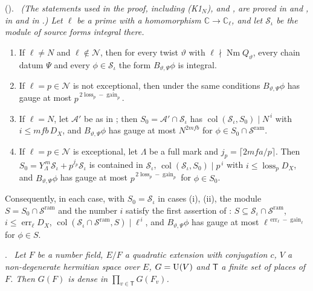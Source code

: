 \documentclass[10pt]{amsart}
\theoremstyle{definition}
\theoremstyle{remark}
\newcommand{\C}{\mathbb C}
\providecommand{\auDX}{D_X}
\providecommand{\auNm}{\operatorname{Nm}}
\providecommand{\auS}{\mathcal S}
\providecommand{\auSram}{\mathcal S^{\mathrm{ram}}}
\providecommand{\aucol}{\operatorname{col}}
\providecommand{\auerr}{\operatorname{err}}
\providecommand{\augain}{\operatorname{gain}}
\providecommand{\paloss}{\operatorname{loss}}
\newenvironment{quotedthm}[2]{\par\medskip\noindent\begingroup
  \textbf{#1}#2.\ \itshape\ignorespaces}{\endgroup\par\medskip}
\begin{document}
\begin{quotedthm}{\cite[Theorem~4.21]{P49}}{ ({\cite[Proposition~14.20]{P46}})}
(The statements used in the proof, {\cite[Lemma~4.13]{P49}} including (K1$_N$),
{\cite[Lemma~5.6(c)]{P49}} and {\cite[Proposition~14.25]{P46}}, are proved in {\cite[\S5.2.9]{P49}}
and {\cite[Corollary~7.16]{P49}}, in {\cite[Proposition~5.24]{P49}} and in {\cite[\S5.1.6]{P49}}.) Let $\ell$ be a prime with a
homomorphism $\C\to\C_\ell$, and let $\auS_\iota$ be the module of source forms integral there.
\begin{enumerate}
\item[(i)] If $\ell\ne N$ and $\ell\notin\mathcal N$, then for every twist $\vartheta$ with
$\ell\nmid\auNm Q_\vartheta$, every chain datum $\Psi$ and every $\phi\in\auS_\iota$ the form
$B_{\vartheta,\Psi}\phi$ is integral.
\item[(ii)] If $\ell=p\in\mathcal N$ is not exceptional, then under the same conditions
$B_{\vartheta,\Psi}\phi$ has gauge at most $p^{\,2\paloss_p-\augain_p}$.
\item[(iii)] If $\ell=N$, let $\mathcal A'$ be as in {\cite[Lemma~6.21]{P49}}; then $S_0=\mathcal A'\cap\auS_\iota$ has
$\aucol(\auS_\iota,S_0)\mid N^{\,i}$ with $i\le mfb\,\auDX$, and $B_{\vartheta,\Psi}\phi$ has gauge
at most $N^{2mfb}$ for $\phi\in S_0\cap\auSram$.
\item[(iv)] If $\ell=p\in\mathcal N$ is exceptional, let $\Lambda$ be a full mark and $j_p=\lceil2mfa/p\rceil$. Then
$S_0=Y_\Lambda^{\,m}\auS_\iota+p^{j_p}\auS_\iota$ is contained in $\auS_\iota$,
$\aucol(\auS_\iota,S_0)\mid p^{\,i}$ with $i\le\paloss_p\auDX$, and $B_{\vartheta,\Psi}\phi$ has
gauge at most $p^{\,2\paloss_p-\augain_p}$ for $\phi\in S_0$.
\end{enumerate}
Consequently, in each case, with $S_0=\auS_\iota$ in cases (i), (ii), the module
$S=S_0\cap\auSram$ and the number $i$ satisfy the first assertion of
{\cite[Proposition~14.20]{P46}}: $S\subseteq\auS_\iota\cap\auSram$, $i\le\auerr_\ell\auDX$,
$\aucol(\auS_\iota\cap\auSram,S)\mid\ell^{\,i}$, and $B_{\vartheta,\Psi}\phi$ has gauge at most
$\ell^{\,\auerr_\ell-\augain_\ell}$ for $\phi\in S$.
\end{quotedthm}

\begin{quotedthm}{\cite[Proposition~6.3]{P49}}{}
Let $F$ be a number field, $E/F$ a quadratic extension with conjugation $c$, $V$ a non-degenerate
hermitian space over $E$, $G=\mathrm U(V)$ and $\mathsf T$ a finite set of places of $F$. Then $G(F)$ is
dense in $\prod_{v\in\mathsf T}G(F_v)$.
\end{quotedthm}
\end{document}
